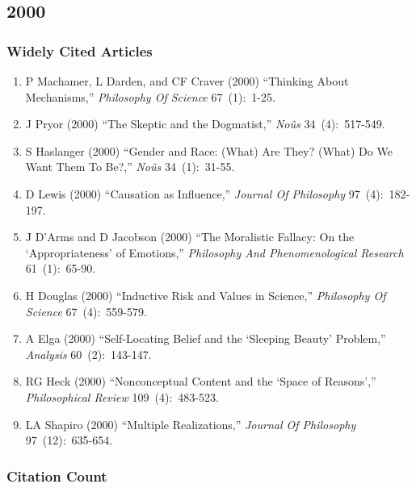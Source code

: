 \documentclass[
  10pt,
  letterpaper,
  DIV=11,
  numbers=noendperiod,
  twoside]{scrartcl}
\providecommand{\tightlist}{%
  \setlength{\itemsep}{0pt}\setlength{\parskip}{0pt}}\usepackage{longtable,booktabs,array}
\begin{document}
\newpage

\subsection{2000}\label{sec-s2000}

\subsubsection*{Widely Cited Articles}\label{widely-cited-articles-44}

\begin{enumerate}
\def\labelenumi{\arabic{enumi}.}
\tightlist
\item
  P Machamer, L Darden, and CF Craver (2000) ``Thinking About
  Mechanisms,'' \emph{Philosophy Of Science} 67~(1):~1-25.
\item
  J Pryor (2000) ``The Skeptic and the Dogmatist,'' \emph{Noûs}
  34~(4):~517-549.
\item
  S Haslanger (2000) ``Gender and Race: (What) Are They? (What) Do We
  Want Them To Be?,'' \emph{Noûs} 34~(1):~31-55.
\item
  D Lewis (2000) ``Causation as Influence,'' \emph{Journal Of
  Philosophy} 97~(4):~182-197.
\item
  J D'Arms and D Jacobson (2000) ``The Moralistic Fallacy: On the
  `Appropriateness' of Emotions,'' \emph{Philosophy And Phenomenological
  Research} 61~(1):~65-90.
\item
  H Douglas (2000) ``Inductive Risk and Values in Science,''
  \emph{Philosophy Of Science} 67~(4):~559-579.
\item
  A Elga (2000) ``Self-Locating Belief and the `Sleeping Beauty'
  Problem,'' \emph{Analysis} 60~(2):~143-147.
\item
  RG Heck (2000) ``Nonconceptual Content and the `Space of Reasons',''
  \emph{Philosophical Review} 109~(4):~483-523.
\item
  LA Shapiro (2000) ``Multiple Realizations,'' \emph{Journal Of
  Philosophy} 97~(12):~635-654.
\end{enumerate}

\subsubsection*{Citation Count}\label{sec-count-2000}
\end{document}
